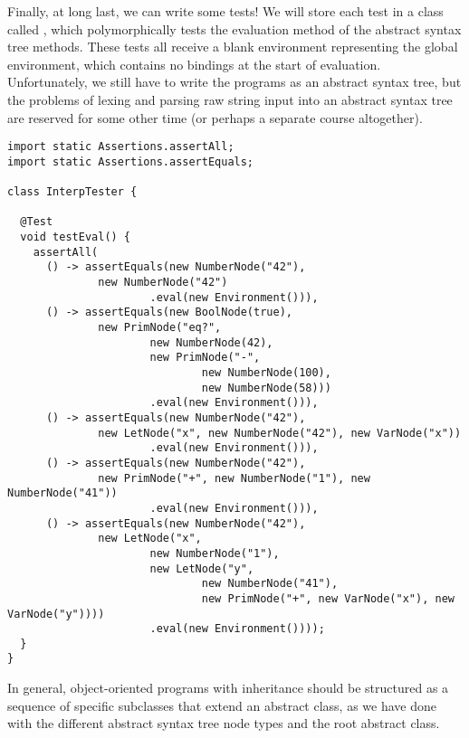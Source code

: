 Finally, at long last, we can write some tests! We will store each test in a class called , which polymorphically tests the evaluation method of the abstract syntax tree methods. These tests all receive a blank environment representing the global environment, which contains no bindings at the start of evaluation. Unfortunately, we still have to write the programs as an abstract syntax tree, but the problems of lexing and parsing raw string input into an abstract syntax tree are reserved for some other time (or perhaps a separate course altogether).

\begin{lstlisting}[language=MyJava]
import static Assertions.assertAll;
import static Assertions.assertEquals;
  
class InterpTester {
  
  @Test
  void testEval() {
    assertAll(
      () -> assertEquals(new NumberNode("42"),
              new NumberNode("42")
                      .eval(new Environment())),
      () -> assertEquals(new BoolNode(true),
              new PrimNode("eq?",
                      new NumberNode(42),
                      new PrimNode("-",
                              new NumberNode(100),
                              new NumberNode(58)))
                      .eval(new Environment())),
      () -> assertEquals(new NumberNode("42"),
              new LetNode("x", new NumberNode("42"), new VarNode("x"))
                      .eval(new Environment())),
      () -> assertEquals(new NumberNode("42"),
              new PrimNode("+", new NumberNode("1"), new NumberNode("41"))
                      .eval(new Environment())),
      () -> assertEquals(new NumberNode("42"),
              new LetNode("x",
                      new NumberNode("1"),
                      new LetNode("y",
                              new NumberNode("41"),
                              new PrimNode("+", new VarNode("x"), new VarNode("y"))))
                      .eval(new Environment())));
  }
}
\end{lstlisting}

In general, object-oriented programs with inheritance should be structured as a sequence of specific subclasses that extend an abstract class, as we have done with the different abstract syntax tree node types and the root  abstract class. 

